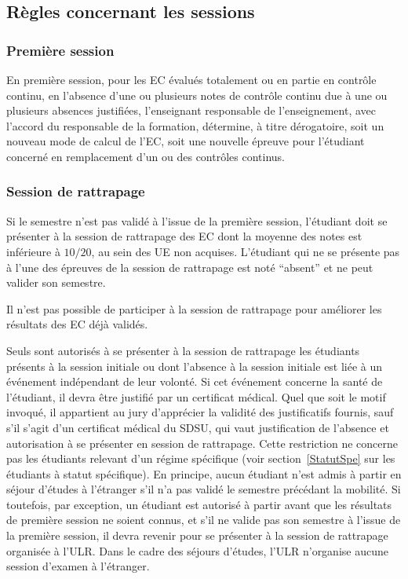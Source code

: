 \documentclass[a4paper,11pt]{article}
\begin{document}
\subsection{Règles concernant les sessions}
\subsubsection{Première session}
En première session, pour les EC évalués totalement ou en partie en contrôle continu, en l'absence d'une ou plusieurs notes de contrôle continu due à une ou plusieurs absences justifiées, l'enseignant responsable de l'enseignement, avec l'accord du responsable de la formation, détermine, à titre dérogatoire, soit un nouveau mode de calcul de l'EC, soit une nouvelle épreuve pour l'étudiant concerné en remplacement d'un ou des contrôles continus.

\subsubsection{Session de rattrapage}
Si le semestre n'est pas validé à l'issue de la première session, l'étudiant doit se présenter à la session de rattrapage des EC dont la moyenne des notes est inférieure à $10/20$, au sein des UE non acquises. L'étudiant qui ne se présente pas à l'une des épreuves de la session de rattrapage est noté ``absent'' et ne peut valider son semestre.

Il n'est pas possible de participer à la session de rattrapage pour améliorer les résultats des EC déjà validés.

Seuls sont autorisés à se présenter à la session de rattrapage les étudiants présents à la session initiale ou dont l'absence à la session initiale est liée à un événement indépendant de leur volonté. Si cet événement concerne la santé de l'étudiant, il devra être justifié par un certificat médical. Quel que soit le motif invoqué, il appartient au jury d'apprécier la validité des justificatifs fournis, sauf s'il s'agit d'un certificat médical du SDSU, qui vaut justification de l'absence et autorisation à se présenter en session de rattrapage.
Cette restriction ne concerne pas les étudiants relevant d'un régime spécifique (voir section~\ref{StatutSpe} sur les étudiants à statut spécifique).
En principe, aucun étudiant n'est admis à partir en séjour d'études à l'étranger s'il n'a pas validé le semestre précédant la mobilité. Si toutefois, par exception, un étudiant est autorisé à partir avant que les résultats de première session ne soient connus, et s'il ne valide pas son semestre à l'issue de la première session, il devra revenir pour se présenter à la session de rattrapage organisée à l'ULR. Dans le cadre des séjours d'études, l'ULR n'organise aucune session d'examen à l'étranger.
\end{document}
